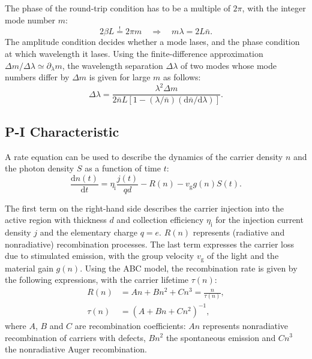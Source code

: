 The phase of the round-trip condition has to be a multiple of $2\pi$, with the integer
mode number $m$:
\begin{equation}
	2\beta L\overset{!}{=}2\pi m\quad\Rightarrow\quad m\lambda=2L\bar n.
\end{equation}
The amplitude condition decides whether a mode lases, and the phase condition at which
wavelength it lases. Using the finite-difference approximation
$\Delta m /\Delta\lambda \simeq \partial_{\lambda}m$, the wavelength separation
$\Delta\lambda$ of two modes whose mode numbers differ by $\Delta m$ is given for
large $m$ as follows:
\begin{equation}
	\Delta\lambda=\frac{\lambda^{2}\Delta m}{2\bar{n}L[1-(\lambda /\bar{n})(\mathrm{d}\bar{n}/\mathrm{d}\lambda)]}.
	\label{eq:laser_spacing}
\end{equation}

\subsection{P-I Characteristic}
\label{sec:p_i_characteristic}

A rate equation can be used to
describe the dynamics of the carrier density $n$ and the photon density $S$ as a
function of time $t$:
\begin{equation}
	\frac{\mathrm{d}n(t)}{\mathrm{d}t}= \eta_{\mathrm{i}}\frac{j(t)}{qd}- R(n) - v_{\mathrm{g}}
	g(n) S(t).
\end{equation}

The first term on the right-hand side describes the carrier injection into the active region with
thickness $d$ and collection efficiency $\eta_{\mathrm{i}}$ for the injection current
density $j$ and the elementary charge $q=e$. $R(n)$ represents (radiative
and nonradiative) recombination processes. The last term expresses the carrier
loss due to stimulated emission, with the group velocity $v_{\mathrm{g}}$ of the light
and the material gain $g(n)$. Using the ABC model, the recombination rate is
given by the following expressions, with the carrier lifetime $\tau(n)$:
\begin{align}
	R(n)    & =An +Bn^{2}+Cn^{3}=\frac{n}{\tau(n)}, \\
	\tau(n) & =(A+Bn+Cn^{2})^{-1},
\end{align}
where $A$, $B$ and $C$ are recombination coefficients: $An$ represents nonradiative
recombination of carriers with defects, $Bn^{2}$ the spontaneous emission and $Cn^{3}$
the nonradiative Auger recombination.

